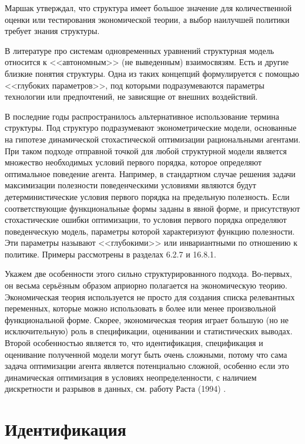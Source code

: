 Маршак утверждал, что структура имеет большое значение для количественной оценки или тестирования экономической теории, а выбор наилучшей политики требует знания структуры. 


В литературе про системам одновременных уравнений  структурная модель относится к <<автономным>> (не выведенным) взаимосвязям. Есть и другие близкие понятия структуры. Одна из таких концепций формулируется с помощью <<глубоких параметров>>, под которыми подразумеваются параметры технологии или предпочтений, не зависящие от внешних воздействий. 


В последние годы распространилось альтернативное использование термина структуры. Под структуро подразумевают эконометрические модели, основанные на гипотезе динамической стохастической оптимизации рациональными агентами. При таком подходе отправной точкой для любой структурной модели  является множество необходимых условий первого порядка, которое определяют оптимальное поведение агента. 
Например, в стандартном случае  решения задачи максимизации полезности поведенческими условиями являются будут детерминистические условия первого порядка на предельную полезность. Если соответствующие функциональные формы заданы в явной форме, и присутствуют стохастические ошибки оптимизации, то условия первого порядка определяют поведенческую модель, параметры которой характеризуют функцию полезности. Эти параметры называют  <<глубокими>> или инвариантными по отношению к политике. Примеры рассмотрены в разделах 6.2.7 и 16.8.1. 


Укажем две особенности этого сильно структурированного подхода. 
Во-первых, он весьма серьёзным образом априорно полагается на экономическую теорию. Экономическая теория  используется не просто для создания списка релевантных переменных, которые можно использовать в более или менее произвольной  функциональной форме. Скорее,  экономическая теория играет большую (но не исключительную) роль в спецификации, оценивании и статистических выводах. Второй особенностью является то, что идентификация, спецификация и оценивание полученной модели могут быть очень сложными, потому что сама задача оптимизации агента является потенциально сложной, особенно если это динамическая оптимизация в условиях неопределенности, с наличием дискретности и разрывов в данных, см. работу Раста (1994) .


\section{Идентификация}


